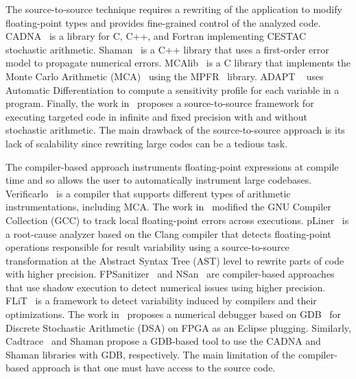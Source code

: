 \documentclass[10pt,journal,compsoc]{IEEEtran}
\DeclareRobustCommand{\add}[1]{\textcolor{ao(english)}{#1}}%
\DeclareRobustCommand{\add}[1]{#1}
\begin{document}
The source-to-source technique requires a rewriting of the application to modify
floating-point types and provides fine-grained control of the analyzed code.
CADNA~\cite{jezequel2008cadna} is a library for C, C++, and Fortran implementing
CESTAC~\cite{vignes1993stochastic} stochastic arithmetic.
Shaman~\cite{demeure_phd} is a C++ library that uses a first-order error model
to propagate numerical errors. MCAlib~\cite{frechtling2015mcalib} is a C library
that implements the Monte Carlo Arithmetic (MCA)~\cite{parker1997monte} using
the MPFR~\cite{fousse2007mpfr} library. \add{ADAPT \mbox{~\cite{menon2018adapt}} uses
    Automatic Differentiation to compute a sensitivity profile for each variable in a
    program}. Finally, the work in~\cite{tang2016software} proposes a
source-to-source framework for executing targeted code in infinite and fixed
precision with and without stochastic arithmetic. The main drawback of the
source-to-source approach is its lack of scalability since rewriting large
codes can be a tedious task.


The compiler-based approach instruments floating-point expressions at compile
time and so allows the user to automatically instrument large codebases.
Verificarlo~\cite{verificarlo} is a compiler that supports different types of
arithmetic instrumentations, including MCA. The work in~\cite{bao2013fly}
modified the GNU Compiler Collection (GCC) to track local floating-point errors
across executions. pLiner~\cite{guo2020pliner} is a root-cause analyzer based on
the Clang compiler that detects floating-point operations responsible for result
variability using a source-to-source transformation at the Abstract Syntax Tree
(AST) level to rewrite parts of code with higher precision.
FPSanitizer~\cite{chowdhary2020debugging,chowdhary2021parallel} \add{and
    NSan~\mbox{\cite{courbet2021nsan}} are compiler-based approaches}
that use shadow execution to detect numerical issues using higher
precision.
FLiT~\cite{sawaya2017flit} is a framework to detect variability
induced by compilers and their optimizations. The work
in~\cite{wang2012development} proposes a numerical debugger based on
GDB~\cite{stallman1988debugging} for Discrete Stochastic Arithmetic (DSA) on
FPGA as an Eclipse plugging. Similarly, Cadtrace~\cite{jezequel2008cadna} and
Shaman propose a GDB-based tool to use the CADNA and Shaman libraries with GDB,
respectively. The main limitation of the compiler-based approach is that one
must have access to the source code.
\end{document}
